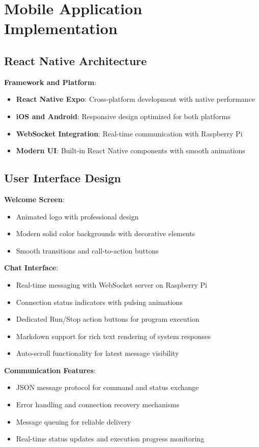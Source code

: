 \section{Mobile Application Implementation}

\subsection{React Native Architecture}

\textbf{Framework and Platform}:
\begin{itemize}
    \item \textbf{React Native Expo}: Cross-platform development with native performance
    \item \textbf{iOS and Android}: Responsive design optimized for both platforms
    \item \textbf{WebSocket Integration}: Real-time communication with Raspberry Pi
    \item \textbf{Modern UI}: Built-in React Native components with smooth animations
\end{itemize}

\subsection{User Interface Design}

\textbf{Welcome Screen}:
\begin{itemize}
    \item Animated logo with professional design
    \item Modern solid color backgrounds with decorative elements
    \item Smooth transitions and call-to-action buttons
\end{itemize}

\textbf{Chat Interface}:
\begin{itemize}
    \item Real-time messaging with WebSocket server on Raspberry Pi
    \item Connection status indicators with pulsing animations
    \item Dedicated Run/Stop action buttons for program execution
    \item Markdown support for rich text rendering of system responses
    \item Auto-scroll functionality for latest message visibility
\end{itemize}

\textbf{Communication Features}:
\begin{itemize}
    \item JSON message protocol for command and status exchange
    \item Error handling and connection recovery mechanisms
    \item Message queuing for reliable delivery
    \item Real-time status updates and execution progress monitoring
\end{itemize}

